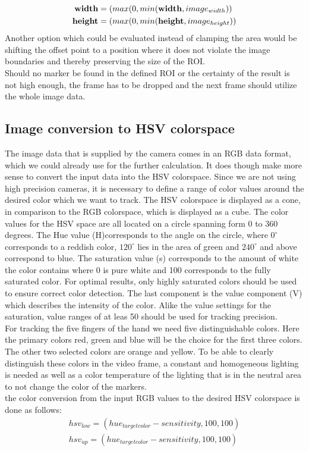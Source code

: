 \begin{equation}
\begin{split}
\textbf{width}&=\text(max(0,min(\mathbf{width},image_{width}))\\
\textbf{height}&=\text(max(0,min(\mathbf{height},image_{height}))
\end{split}
\end{equation}
Another option which could be evaluated instead of clamping the area would be shifting the offset point to a position where it does not violate the image boundaries and  thereby preserving the size of the ROI.\\
Should no marker be found in the defined ROI or the certainty of the result is not high enough, the frame has to be dropped and the next frame should utilize the whole image data.
\subsection{Image conversion to HSV colorspace}
The image data that is supplied by the camera comes in an RGB data format, which we could already use for the further calculation. It does though make more sense to convert the input data into the HSV colorspace. Since we are not using high precision cameras, it is necessary to define a range of color values around the desired color which we want to track. The HSV colorspace is displayed as a cone, in comparison to the RGB colorspace, which is displayed as a cube. The color values for the HSV space are all located on a circle spanning form 0 to 360 degrees. The Hue value (H)corresponds to the angle on the circle, where $0^\circ$ corresponds to a reddish color, $120^\circ$ lies in the area of green and $240^\circ$ and above correspond to blue. The saturation value (s) corresponds to the amount of white the color contains  where 0 is pure white and 100 corresponds to the fully saturated color. For optimal results, only highly saturated colors should be used to ensure correct color detection. The last component is the value component (V) which describes the intensity of the color. Alike the value settings for the saturation, value ranges of at leas 50 should be used for tracking precision.
\\
For tracking the five fingers of the hand we need five distinguishable colors. Here the primary colors red, green and blue will be the choice for the first three colors. The other two selected colors  are orange and yellow. To be able to clearly distinguish these colors in the video frame, a constant and homogeneous lighting is needed as well as a color temperature of the lighting that is in the neutral area to not change the color of the markers.
\\the color conversion from the input RGB values to the desired HSV colorspace is done as follows:
\begin{equation}
\begin{split}
hsv_{low}=(hue_{targetcolor}-sensitivity,100,100)\\
hsv_{up}=(hue_{targetcolor}-sensitivity,100,100)\\
\end{split}
\end{equation}
